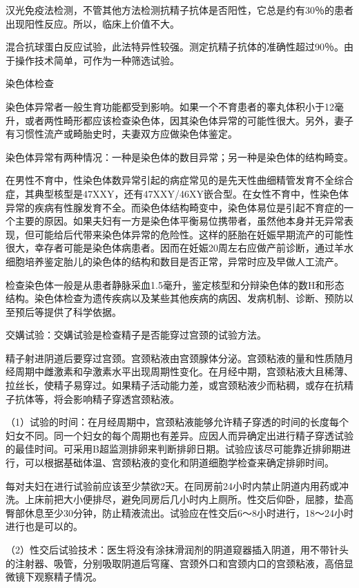\documentclass[12pt,UTF8]{ctexbook}
\begin{document}
汉光免疫法检测，不管其他方法检测抗精子抗体是否阳性，它总是约有30％的患者出现阳性反应。所以，临床上价值不大。

混合抗球蛋白反应试验，此法特异性较强。测定抗精子抗体的准确性超过90％。由于操作技术简单，可作为一种筛选试验。

染色体检查

染色体异常者一般生育功能都受到影响。如果一个不育患者的睾丸体积小于12毫升，或者两性畸形都应该检查染色体，因其染色体异常的可能性很大。另外，妻子有习惯性流产或畸胎史时，夫妻双方应做染色体鉴定。

染色体异常有两种情况：一种是染色体的数目异常；另一种是染色体的结构畸变。

在男性不育中，性染色体数异常引起的病症常见的是先天性曲细精管发育不全综合症，其典型核型是47XXY，还有47XXY/46XY嵌合型。在女性不育中，性染色体异常的疾病有性腺发育不全。而染色体结构畸变中，染色体易位是引起不育症的一个主要的原因。如果夫妇有一方是染色体平衡易位携带者，虽然他本身并无异常表现，但可能给后代带来染色体异常的危险性。这样的胚胎在妊娠早期流产的可能性很大，幸存者可能是染色体病患者。因而在妊娠20周左右应做产前诊断，通过羊水细胞培养鉴定胎儿的染色体的结构和数目是否正常，异常时应及早做人工流产。

检查染色体一般是从患者静脉采血1.5毫升，鉴定核型和分辩染色体的数H和形态结构。染色体检查为遗传疾病以及某些其他疾病的病因、发病机制、诊断、预防以至预后等提供了科学依据。

交媾试验：交媾试验是检查精子是否能穿过宫颈的试验方法。

精子射进阴道后要穿过宫颈。宫颈粘液由宫颈腺体分泌。宫颈粘液的量和性质随月经周期中雌激素和孕激素水平出现周期性变化。在月经中期，宫颈粘液大且稀薄、拉丝长，使精子易穿过。如果精子活动能力差，或宫颈粘液少而粘稠，或存在抗精子抗体等，将会影响精子穿透宫颈粘液。

（1）试验的时间：在月经周期中，宫颈粘液能够允许精子穿透的时间的长度每个妇女不同。同一个妇女的每个周期也有差异。应因人而异确定出进行精子穿透试验的最佳时间。可采用B超监测排卵来判断排卵日期。试验应该尽可能靠近排卵期进行，可以根据基础体温、宫颈粘液的变化和阴道细胞学检查来确定排卵时间。

每对夫妇在进行试验前应该至少禁欲2天。在同房前24小时内禁止阴道内用药或冲洗。上床前把大小便排尽，避免同房后几小时内上厕所。性交后仰卧，屈膝，垫高臀部休息至少30分钟，防止精液流出。试验应在性交后6～8小时进行，18～24小时进行也是可以的。

（2）性交后试验技术：医生将没有涂抹滑润剂的阴道窥器插入阴道，用不带针头的注射器、吸管，分别吸取阴道后穹窿、宫颈外口和宫颈内口的宫颈粘液，高倍显微镜下观察精子情况。
\end{document}
